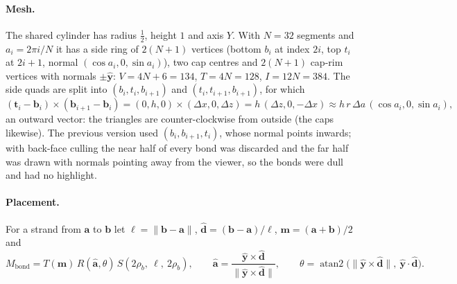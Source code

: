 \documentclass[a4paper, 11pt]{article}
\begin{document}
\paragraph{Mesh.} The shared cylinder has radius $\tfrac12$, height $1$ and axis $Y$. With $N=32$ segments and $a_i=2\pi i/N$ it has a side
ring of $2(N+1)$ vertices (bottom $b_i$ at index $2i$, top $t_i$ at $2i+1$, normal $(\cos a_i,0,\sin a_i)$), two cap centres and $2(N+1)$ cap-rim
vertices with normals $\pm\hat{\mathbf y}$: $V=4N+6=134$, $T=4N=128$, $I=12N=384$. The side quads are split into $(b_i,t_i,b_{i+1})$ and
$(t_i,t_{i+1},b_{i+1})$, for which
\[
  (\mathbf t_i-\mathbf b_i)\times(\mathbf b_{i+1}-\mathbf b_i)=(0,h,0)\times(\Delta x,0,\Delta z)=h\,(\Delta z,0,-\Delta x)
  \approx h\,r\,\Delta a\,(\cos a_i,0,\sin a_i),
\]
an outward vector: the triangles are counter-clockwise from outside (the caps likewise). The previous version used $(b_i,b_{i+1},t_i)$,
whose normal points inwards; with back-face culling the near half of every bond was discarded and the far half was drawn with normals pointing
away from the viewer, so the bonds were dull and had no highlight.

\paragraph{Placement.} For a strand from $\mathbf a$ to $\mathbf b$ let $\ell=\|\mathbf b-\mathbf a\|$, $\hat{\mathbf d}=(\mathbf b-\mathbf a)/\ell$,
$\mathbf m=(\mathbf a+\mathbf b)/2$ and
\begin{equation}
  M_{\text{bond}}=T(\mathbf m)\,R(\hat{\mathbf a},\theta)\,S(2\rho_b,\ \ell,\ 2\rho_b),\qquad
  \hat{\mathbf a}=\frac{\hat{\mathbf y}\times\hat{\mathbf d}}{\|\hat{\mathbf y}\times\hat{\mathbf d}\|},\qquad
  \theta=\operatorname{atan2}\bigl(\|\hat{\mathbf y}\times\hat{\mathbf d}\|,\ \hat{\mathbf y}\cdot\hat{\mathbf d}\bigr).
  \label{eq:bond}
\end{equation}
\end{document}
